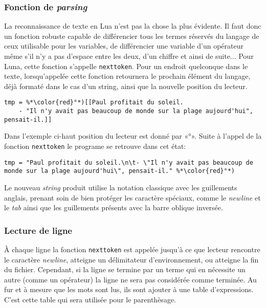 \documentclass{article}
\begin{document}
\subsubsection{Fonction de \textit{parsing}}
La reconnaissance de texte en Lua n'est pas la chose la plus évidente. Il faut donc un fonction robuste capable de différencier tous les termes réservés du langage de ceux utilisable pour les variables, de différencier une variable d'un opérateur même s'il n'y a pas d'espace entre les deux, d'un chiffre et ainsi de suite... Pour Luna, cette fonction s'appelle \texttt{nexttoken}. Pour un endroit quelconque dans le texte, lorsqu'appelée cette fonction retournera le prochain élément du langage, déjà formaté dans le cas d'un string, ainsi que la nouvelle position du lecteur.
\begin{lstlisting}[caption={Lecture d'un string},label=DescriptiveLabel]
tmp = %*\color{red}°*)[[Paul profitait du soleil.
	- "Il n'y avait pas beaucoup de monde sur la plage aujourd'hui", pensait-il.]]
\end{lstlisting}

Dans l'exemple ci-haut position du lecteur est donné par «{\color{red}°}». Suite à l'appel de la fonction \texttt{nexttoken} le programe se retrouve dans cet état:
\begin{lstlisting}[belowcaptionskip = -1\baselineskip]
tmp = "Paul profitait du soleil.\n\t- \"Il n'y avait pas beaucoup de monde sur la plage aujourd'hui\", pensait-il." %*\color{red}°*)
\end{lstlisting}

Le nouveau \textit{string} produit utilise la notation classique avec les guillements anglais, prenant soin de bien protéger les caractère spéciaux, comme le \textit{newline} et le \textit{tab} ainsi que les guillements présents avec la barre oblique inversée.

\subsubsection{Lecture de ligne}
À chaque ligne la fonction \texttt{nexttoken} est appelée jusqu'à ce que lecteur rencontre le caractère \textit{newline}, atteigne un délimitateur d'environnement, ou atteigne la fin du fichier. Cependant, si la ligne se termine par un terme qui en nécessite un autre (comme un opérateur) la ligne ne sera pas considérée comme terminée. Au fur et à mesure que les mots sont lus, ils sont ajouter à une table d'expressions. C'est cette table qui sera utilisée pour le parenthèsage.
\end{document}
